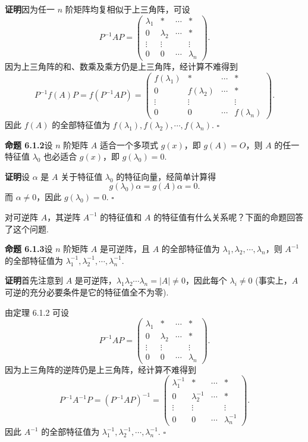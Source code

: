 \documentclass[UTF8,12pt,a4paper,fontset=fandol]{ctexart}
\begin{document}
\noindent\textbf{证明}\quad 因为任一 $n$ 阶矩阵均复相似于上三角阵，可设
\[
P^{-1}AP=
\left(\begin{array}{cccc}
\lambda_1 & * & \cdots & *\\
0 & \lambda_2 & \cdots & *\\
\vdots & \vdots & & \vdots\\
0 & 0 & \cdots & \lambda_n
\end{array}\right).
\]
因为上三角阵的和、数乘及乘方仍是上三角阵，经计算不难得到
\[
P^{-1}f(A)P=f(P^{-1}AP)=
\left(\begin{array}{cccc}
f(\lambda_1) & * & \cdots & *\\
0 & f(\lambda_2) & \cdots & *\\
\vdots & \vdots & & \vdots\\
0 & 0 & \cdots & f(\lambda_n)
\end{array}\right).
\]
因此 $f(A)$ 的全部特征值为 $f(\lambda_1),f(\lambda_2),\cdots,f(\lambda_n)$. $\square$

\noindent\textbf{命题 6.1.2}\quad 设 $n$ 阶矩阵 $A$ 适合一个多项式 $g(x)$，即 $g(A)=O$，则 $A$ 的任一特征值 $\lambda_0$ 也必适合 $g(x)$，即 $g(\lambda_0)=0$.

\noindent\textbf{证明}\quad 设 $\alpha$ 是 $A$ 关于特征值 $\lambda_0$ 的特征向量，经简单计算得
\[
g(\lambda_0)\alpha=g(A)\alpha=0.
\]
而 $\alpha\neq 0$，因此 $g(\lambda_0)=0$. $\square$

对可逆阵 $A$，其逆阵 $A^{-1}$ 的特征值和 $A$ 的特征值有什么关系呢？下面的命题回答了这个问题.

\noindent\textbf{命题 6.1.3}\quad 设 $n$ 阶矩阵 $A$ 是可逆阵，且 $A$ 的全部特征值为 $\lambda_1,\lambda_2,\cdots,\lambda_n$，则 $A^{-1}$ 的全部特征值为 $\lambda_1^{-1},\lambda_2^{-1},\cdots,\lambda_n^{-1}$.

\noindent\textbf{证明}\quad 首先注意到 $A$ 是可逆阵，$\lambda_1\lambda_2\cdots\lambda_n=|A|\neq 0$，因此每个 $\lambda_i\neq 0$ (事实上，$A$ 可逆的充分必要条件是它的特征值全不为零).

由定理 6.1.2 可设
\[
P^{-1}AP=
\left(\begin{array}{cccc}
\lambda_1 & * & \cdots & *\\
0 & \lambda_2 & \cdots & *\\
\vdots & \vdots & & \vdots\\
0 & 0 & \cdots & \lambda_n
\end{array}\right).
\]
因为上三角阵的逆阵仍是上三角阵，经计算不难得到
\[
P^{-1}A^{-1}P=(P^{-1}AP)^{-1}=
\left(\begin{array}{cccc}
\lambda_1^{-1} & * & \cdots & *\\
0 & \lambda_2^{-1} & \cdots & *\\
\vdots & \vdots & & \vdots\\
0 & 0 & \cdots & \lambda_n^{-1}
\end{array}\right).
\]
因此 $A^{-1}$ 的全部特征值为 $\lambda_1^{-1},\lambda_2^{-1},\cdots,\lambda_n^{-1}$. $\square$
\end{document}
